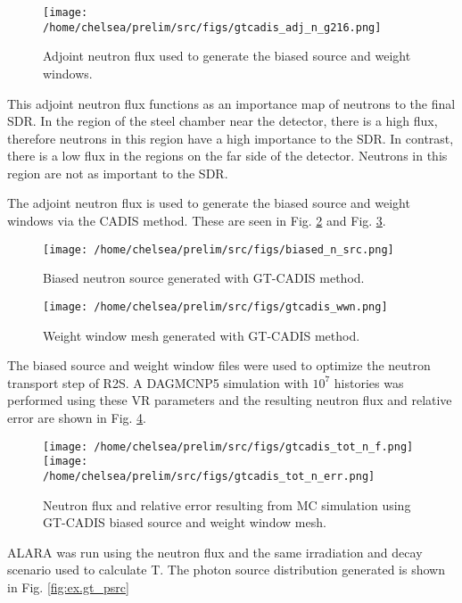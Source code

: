 \begin{figure}
	\texttt{[image: /home/chelsea/prelim/src/figs/gtcadis\_adj\_n\_g216.png]}
	\caption [GT-CADIS adjoint neutron flux] 
	{Adjoint neutron flux used to generate the biased source and weight
	windows.\label{fig:ex.adj_n_flux} }
\end{figure}

This adjoint neutron flux functions as an importance map of neutrons to the
final SDR.  In the region of the steel chamber near the detector, there is a 
high flux, therefore neutrons in this region have a high importance to the SDR.
In contrast, there is a low flux in the regions on the
far side of the detector.  Neutrons in this region are not as important to the
SDR.

The adjoint neutron flux is used to generate the biased source and weight
windows via the CADIS method.  These are seen in Fig. \ref{fig:ex.biased_src} and
Fig. \ref{fig:ex.wwinp}.

\begin{figure} 
	\texttt{[image: /home/chelsea/prelim/src/figs/biased\_n\_src.png]}
	\caption [GT-CADIS biased neutron source] 
	{Biased neutron source generated with GT-CADIS method.\label{fig:ex.biased_src}}
\end{figure}

\begin{figure} 
	\texttt{[image: /home/chelsea/prelim/src/figs/gtcadis\_wwn.png]}
	\caption [GT-CADIS weight window mesh]
	{Weight window mesh generated with GT-CADIS method.\label{fig:ex.wwinp}}
\end{figure}

The biased source and weight window files were used to optimize the neutron
transport step of R2S.  A DAGMCNP5 simulation with $10^7$ histories was performed using these VR
parameters and the resulting neutron flux and relative error are shown in Fig.
\ref{fig:ex.gt_nflux}.

\begin{figure} 
	\texttt{[image: /home/chelsea/prelim/src/figs/gtcadis\_tot\_n\_f.png]}
	\texttt{[image: /home/chelsea/prelim/src/figs/gtcadis\_tot\_n\_err.png]}
	\caption [GT-CADIS neutron flux and relative error] 
	{Neutron flux and relative error resulting from MC simulation using
	 GT-CADIS biased source and weight window mesh.\label{fig:ex.gt_nflux}}
\end{figure}

ALARA was run using the neutron flux and the same irradiation and decay scenario used to calculate
T.  The photon source distribution generated is shown in Fig. \ref{fig:ex.gt_psrc}

